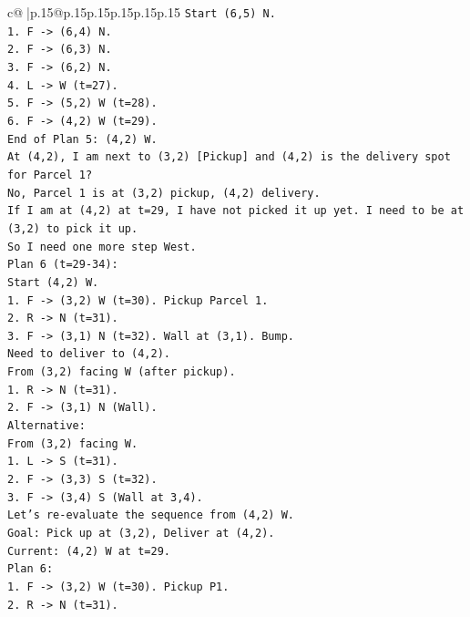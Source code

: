 \documentclass{article}
\begin{document}
{\begin{supertabular}{c@{$\;$}|p{.15\linewidth}@{}p{.15\linewidth}p{.15\linewidth}p{.15\linewidth}p{.15\linewidth}p{.15\linewidth}}
{{{\texttt{Start (6,5) N.} \\
\texttt{1. F {-}> (6,4) N.} \\
\texttt{2. F {-}> (6,3) N.} \\
\texttt{3. F {-}> (6,2) N.} \\
\texttt{4. L {-}> W (t=27).} \\
\texttt{5. F {-}> (5,2) W (t=28).} \\
\texttt{6. F {-}> (4,2) W (t=29).} \\
\texttt{End of Plan 5: (4,2) W.} \\
\texttt{At (4,2), I am next to (3,2) {[}Pickup{]} and (4,2) is the delivery spot for Parcel 1?} \\
\texttt{No, Parcel 1 is at (3,2) pickup, (4,2) delivery.} \\
\texttt{If I am at (4,2) at t=29, I have not picked it up yet. I need to be at (3,2) to pick it up.} \\
\texttt{So I need one more step West.} \\
\texttt{Plan 6 (t=29{-}34):} \\
\texttt{Start (4,2) W.} \\
\texttt{1. F {-}> (3,2) W (t=30). Pickup Parcel 1.} \\
\texttt{2. R {-}> N (t=31).} \\
\texttt{3. F {-}> (3,1) N (t=32). Wall at (3,1). Bump.} \\
\texttt{Need to deliver to (4,2).} \\
\texttt{From (3,2) facing W (after pickup).} \\
\texttt{1. R {-}> N (t=31).} \\
\texttt{2. F {-}> (3,1) N (Wall).} \\
\texttt{Alternative:} \\
\texttt{From (3,2) facing W.} \\
\texttt{1. L {-}> S (t=31).} \\
\texttt{2. F {-}> (3,3) S (t=32).} \\
\texttt{3. F {-}> (3,4) S (Wall at 3,4).} \\
\texttt{Let's re{-}evaluate the sequence from (4,2) W.} \\
\texttt{Goal: Pick up at (3,2), Deliver at (4,2).} \\
\texttt{Current: (4,2) W at t=29.} \\
\texttt{Plan 6:} \\
\texttt{1. F {-}> (3,2) W (t=30). Pickup P1.} \\
\texttt{2. R {-}> N (t=31).} \\
}}}
\end{supertabular}}
\end{document}
